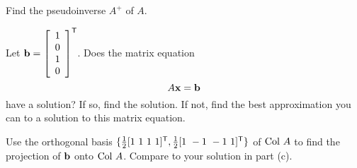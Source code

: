 \begin{example}
\item Find the pseudoinverse $A^+$ of $A$.

\item Let $\mathbf{b} = \left[ \begin{array}{c} 1\\0\\1\\0 \end{array} \right]^{\mathsf{T}}$. Does the matrix equation
    \[A \mathbf{x} = \mathbf{b}\]
    have a solution? If so, find the solution. If not, find the best approximation you can to a solution to this matrix equation.

\item Use the orthogonal basis $\{\frac{1}{2}[1 \ 1 \ 1 \ 1]^{\tr}, \frac{1}{2}[1 \ -1 \ -1 \ 1]^{\tr}\}$ of $\text{Col } A$ to find the projection of $\mathbf{b}$ onto $\text{Col } A$. Compare to your solution in part (c).

\ea

\ExampleSolution

\ba


\end{example}
